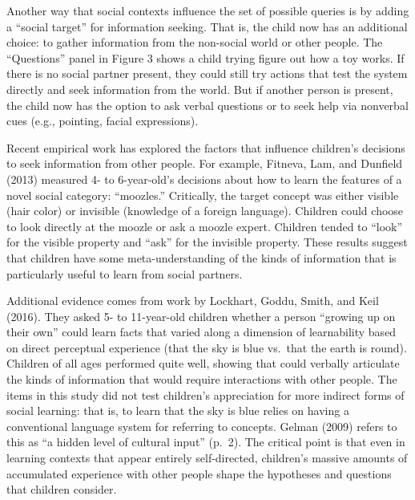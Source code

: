\documentclass[english,floatsintext,man]{apa6}
\theoremstyle{definition}
\theoremstyle{definition}
\theoremstyle{definition}
\theoremstyle{remark}
\begin{document}
Another way that social contexts influence the set of possible queries
is by adding a \enquote{social target} for information seeking. That is,
the child now has an additional choice: to gather information from the
non-social world or other people. The \enquote{Questions} panel in
Figure 3 shows a child trying figure out how a toy works. If there is no
social partner present, they could still try actions that test the
system directly and seek information from the world. But if another
person is present, the child now has the option to ask verbal questions
or to seek help via nonverbal cues (e.g., pointing, facial expressions).

Recent empirical work has explored the factors that influence children's
decisions to seek information from other people. For example, Fitneva,
Lam, and Dunfield (2013) measured 4- to 6-year-old's decisions about how
to learn the features of a novel social category: \enquote{moozles.}
Critically, the target concept was either visible (hair color) or
invisible (knowledge of a foreign language). Children could choose to
look directly at the moozle or ask a moozle expert. Children tended to
\enquote{look} for the visible property and \enquote{ask} for the
invisible property. These results suggest that children have some
meta-understanding of the kinds of information that is particularly
useful to learn from social partners.

Additional evidence comes from work by Lockhart, Goddu, Smith, and Keil
(2016). They asked 5- to 11-year-old children whether a person
\enquote{growing up on their own} could learn facts that varied along a
dimension of learnability based on direct perceptual experience (that
the sky is blue vs.~that the earth is round). Children of all ages
performed quite well, showing that could verbally articulate the kinds
of information that would require interactions with other people. The
items in this study did not test children's appreciation for more
indirect forms of social learning: that is, to learn that the sky is
blue relies on having a conventional language system for referring to
concepts. Gelman (2009) refers to this as \enquote{a hidden level of
cultural input} (p.~2). The critical point is that even in learning
contexts that appear entirely self-directed, children's massive amounts
of accumulated experience with other people shape the hypotheses and
questions that children consider.
\end{document}
